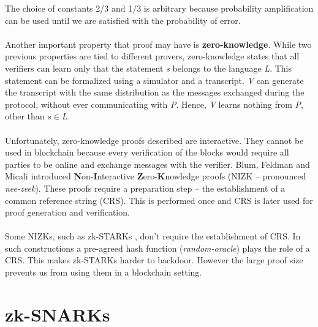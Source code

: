 \noindent The choice of constants 2/3 and 1/3 is arbitrary because probability amplification can be used until we are satisfied with the probability of error.\\
\\
Another important property that proof may have is \textbf{zero-knowledge}. While two previous properties are tied to different provers, zero-knowledge states that all verifiers can learn only that the statement \textit{s} belongs to the language \textit{L}. This statement can be formalized using a simulator and a transcript. \textit{V} can generate the transcript with the same distribution as the messages exchanged during the protocol, without ever communicating with \textit{P}. Hence, \textit{V} learns nothing from \textit{P}, other than $s \in L$.\\
\\
Unfortunately, zero-knowledge proofs described are interactive. They cannot be used in blockchain because every verification of the blocks would require all parties to be online and exchange messages with the verifier. Blum, Feldman and Micali \cite{blum1988non} introduced \textbf{N}on-\textbf{I}nteractive \textbf{Z}ero-\textbf{K}nowledge proofs (NIZK -- pronounced \textit{nee-zeek}). These proofs require a preparation step -- the establishment of a common reference string (CRS). This is performed once and CRS is later used for proof generation and verification.\\
\\
Some NIZKs, such as zk-STARKs \cite{ben2018scalable}, don't require the establishment of CRS. In such constructions a pre-agreed hash function (\textit{random-oracle}) plays the role of a CRS. This makes zk-STARKs harder to backdoor. However the large proof size prevents us from using them in a blockchain setting.

\section{zk-SNARKs}

